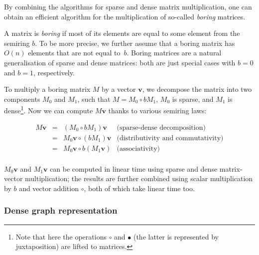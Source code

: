\documentclass[11pt,letterpaper]{article}
\begin{document}

By combining the algorithms for sparse and dense matrix multiplication, one can
obtain an efficient algorithm for the multiplication of so-called \emph{boring}
matrices.

A matrix is \emph{boring} if most of its elements are equal to some element from
the semiring $b$. To be more precise, we further assume that a boring matrix has
$O(n)$ elements that are not equal to~$b$. Boring matrices are a natural
generalisation of sparse and dense matrices: both are just special cases with
$b=0$ and $b=1$, respectively.

To multiply a boring matrix $M$ by a vector $\mathbf{v}$, we decompose the
matrix into two components $M_0$ and $M_1$, such that $M = M_0 \circ b M_1$,
$M_0$ is sparse, and $M_1$ is dense\footnote{Note that here the operations
$\circ$ and $\bullet$ (the latter is represented by juxtaposition) are lifted to
matrices.}. Now we can compute $M \mathbf{v}$ thanks to various semiring laws:

\[
\begin{array}{rcll}
M \mathbf{v} & = & (M_0 \circ b M_1) \mathbf{v} & \text{(sparse-dense decomposition)}\\
 & = & M_0 \mathbf{v} \circ (b M_1) \mathbf{v} & \text{(distributivity and commutativity)}\\
 & = & M_0 \mathbf{v} \circ b (M_1 \mathbf{v}) & \text{(associativity)}\\
\end{array}
\]


\noindent
$M_0 \mathbf{v}$ and $M_1 \mathbf{v}$ can be computed in linear time using
sparse and dense matrix-vector multiplication; the results are further combined
using scalar multiplication by $b$ and vector addition $\circ$, both of which
take linear time too.



\subsubsection{Dense graph representation}\label{sec-dense-graph}
\end{document}
